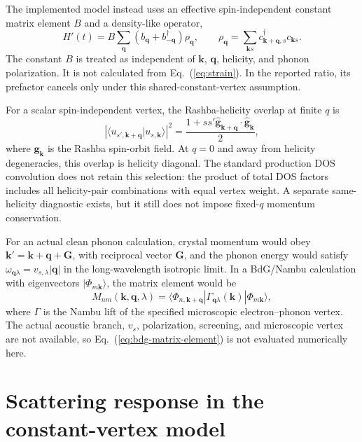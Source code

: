 \documentclass[aps,prb,preprint,superscriptaddress]{revtex4-2}
\begin{document}
The implemented model instead uses an effective spin-independent constant matrix element $B$ and a density-like operator,
\begin{equation}
 H'(t)=B\sum_{\bm q}(b_{\bm q}+b^\dagger_{-\bm q})\rho_{\bm q},\qquad
 \rho_{\bm q}=\sum_{\bm k s}c^\dagger_{\bm{k+q},s}c_{\bm k s}.
 \label{eq:phenom-vertex}
\end{equation}
The constant $B$ is treated as independent of $\bm k$, $\bm q$, helicity, and phonon polarization. It is not calculated from Eq.~(\ref{eq:strain}). In the reported ratio, its prefactor cancels only under this shared-constant-vertex assumption.

For a scalar spin-independent vertex, the Rashba-helicity overlap at finite $q$ is
\begin{equation}
 \left|\langle u_{s',\bm{k+q}}|u_{s,\bm k}\rangle\right|^2
 =\frac{1+ss'\widehat{\bm g}_{\bm{k+q}}\cdot\widehat{\bm g}_{\bm k}}{2},
 \label{eq:helicity-overlap}
\end{equation}
where $\bm g_{\bm k}$ is the Rashba spin-orbit field. At $q=0$ and away from helicity degeneracies, this overlap is helicity diagonal. The standard production DOS convolution does not retain this selection: the product of total DOS factors includes all helicity-pair combinations with equal vertex weight. A separate same-helicity diagnostic exists, but it still does not impose fixed-$q$ momentum conservation.

For an actual clean phonon calculation, crystal momentum would obey $\bm k'=\bm k+\bm q+\bm G$, with reciprocal vector $\bm G$, and the phonon energy would satisfy $\omega_{\bm q\lambda}=v_{s,\lambda}|\bm q|$ in the long-wavelength isotropic limit. In a BdG/Nambu calculation with eigenvectors $|\Phi_{m\bm k}\rangle$, the matrix element would be
\begin{equation}
 M_{nm}(\bm k,\bm q,\lambda)=
 \langle\Phi_{n,\bm{k+q}}|\Gamma_{\bm q\lambda}(\bm k)|\Phi_{m\bm k}\rangle,
 \label{eq:bdg-matrix-element}
\end{equation}
where $\Gamma$ is the Nambu lift of the specified microscopic electron--phonon vertex. The actual acoustic branch, $v_s$, polarization, screening, and microscopic vertex are not available, so Eq.~(\ref{eq:bdg-matrix-element}) is not evaluated numerically here.

\section{Scattering response in the constant-vertex model}
\end{document}
